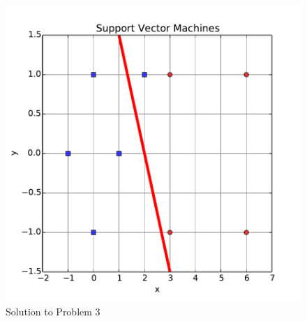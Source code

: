 \begin{figure}[!h]
\centering
\includegraphics[width=.5\linewidth]{progs/1c.pdf}
\caption{Solution to Problem 3}
\label{fig:1c}
\end{figure}


